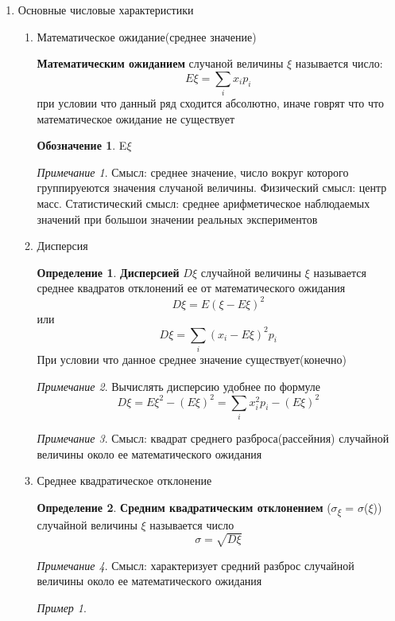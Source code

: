 \documentclass[english]{article}
\theoremstyle{plain}
\theoremstyle{remark}
\newtheorem*{remark}{Примечание}
\newtheorem*{examp}{Пример}
\theoremstyle{definition}
\newtheorem*{definition}{Определение}
\newtheorem*{symb}{Обозначение}
\begin{document}
\begin{enumerate}
\item Основные числовые характеристики
\label{sec:orgd23b841}
\begin{enumerate}
\item Математическое ожидание(среднее значение)
\label{sec:org5d59278}
\begin{defintion}
\textbf{Математическим ожиданием} случаной величины \(\xi\) называется число:
\[ E\xi = \sum\limits_i x_i p_i \] при условии что данный ряд сходится абсолютно, иначе говрят что что математическое ожидание не существует
\end{defintion}
\begin{symb}
E\(\xi\)
\end{symb}
\begin{remark}
Смысл: среднее значение, число вокруг которого группируеются значения случаной величины. Физический смысл: центр масс. Статистический смысл: среднее арифметическое наблюдаемых значений при большои значении реальных экспериментов
\end{remark}
\item Дисперсия
\label{sec:org4948741}
\begin{definition}
\textbf{Дисперсией} \(D\xi\) случайной величины \(\xi\) называется среднее квадратов отклонений ее от математического ожидания
\[ D\xi = E(\xi - E\xi)^2 \] или \[D\xi = \sum\limits_i (x_i - E\xi)^2 p_i \]
При условии что данное среднее значение существует(конечно)
\end{definition}
\begin{remark}
Вычислять дисперсию удобнее по формуле \[ D\xi = E\xi^2 - (E\xi)^2  = \sum\limits_i x_i^2p_i - (E\xi)^2\]
\end{remark}
\begin{remark}
Смысл: квадрат среднего разброса(рассейния) случайной величины около ее математического ожидания
\end{remark}
\item Среднее квадратическое отклонение
\label{sec:org8f8f739}
\begin{definition}
\textbf{Средним квадратическим отклонением} (\(\sigma\)\textsubscript{\(\xi\)} = \(\sigma\)(\(\xi\))) случайной величины \(\xi\) называется число
\[ \sigma = \sqrt{D\xi} \]
\end{definition}
\begin{remark}
Смысл: характеризует средний разброс случайной величины около ее математического ожидания
\end{remark}
\begin{examp}

\end{examp}
\end{enumerate}
\end{enumerate}
\end{document}
